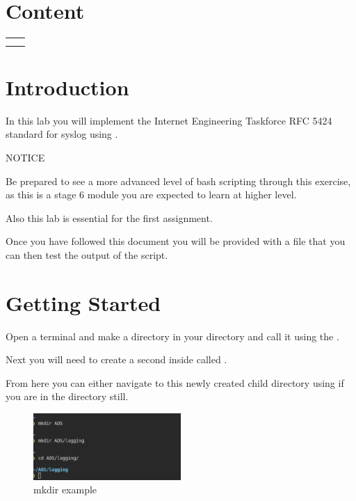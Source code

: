 \documentclass{article}
\author{Sebastian Blair}
\date{\today}
\begin{document}


\section*{Content}
\label{sec:content}

\begin{table}[H]
    \centering
    \begin{tabular}{c|c}
        \nameref{sec:intro} &  \\
         \nameref{sec:get_st}&  \nameref{subsec:func_log}\\
         
    \end{tabular}
\end{table}

\section*{Introduction}
\label{sec:intro}

In this lab you will implement the Internet Engineering Taskforce RFC 5424 standard for syslog using . 

\begin{shaded}
\textbf{\faInfo} \hspace{1em} NOTICE

Be prepared to see a more advanced level of bash scripting through this exercise, as this is a stage 6 module you are expected to learn at higher level. 

Also this lab is essential for the first assignment.
\end{shaded}

Once you have followed this document you will be provided with a file that you can then test the output of the script.

\section*{Getting Started}
\label{sec:get_st}
Open a terminal and make a directory in your  directory and call it  using the . 

Next you will need to create a second inside  called . 

From here you can either navigate to this newly created child directory using  if you are in the  directory still. 

\begin{figure}[H]
    \centering
    \includegraphics[width=0.5\textwidth]{images/mkdir.png}
    \caption{mkdir example}
\end{figure}
\end{document}
